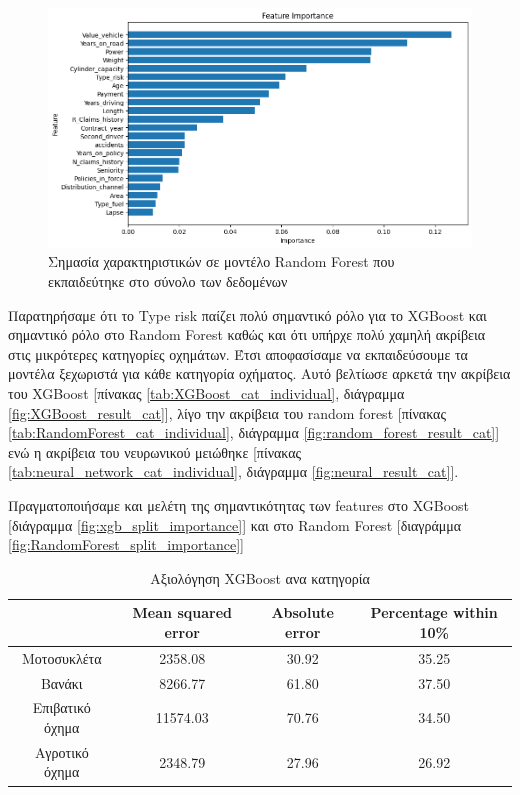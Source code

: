 \documentclass{llncs}
\begin{document}
\begin{figure}
    \begin{center}
        \includegraphics[width=1\textwidth]{images/feature_importance_combined_random_forest.png}
    \end{center}
    \caption{Σημασία χαρακτηριστικών σε μοντέλο Random Forest που εκπαιδεύτηκε στο σύνολο των δεδομένων}  
    \label{fig:random_forest_all_feature_importance}  
\end{figure}

Παρατηρήσαμε ότι το Type risk παίζει πολύ σημαντικό ρόλο για το XGBoost και σημαντικό ρόλο στο
Random Forest καθώς και ότι υπήρχε πολύ χαμηλή ακρίβεια στις μικρότερες κατηγορίες οχημάτων. Έτσι
αποφασίσαμε να εκπαιδεύσουμε τα μοντέλα ξεχωριστά για κάθε κατηγορία οχήματος. Αυτό βελτίωσε αρκετά την ακρίβεια 
του XGBoost [πίνακας \ref{tab:XGBoost_cat_individual}, διάγραμμα \ref{fig:XGBoost_result_cat}], 
λίγο την ακρίβεια του random forest [πίνακας \ref{tab:RandomForest_cat_individual}, διάγραμμα \ref{fig:random_forest_result_cat}] 
ενώ η ακρίβεια του νευρωνικού μειώθηκε [πίνακας \ref{tab:neural_network_cat_individual}, διάγραμμα \ref{fig:neural_result_cat}].

Πραγματοποιήσαμε και μελέτη της σημαντικότητας των features 
στο XGBoost [διάγραμμα \ref{fig:xgb_split_importance}] και 
στο Random Forest [διαγράμμα \ref{fig:RandomForest_split_importance}]

\begin{table}
    \centering
    \begin{tabular}{|c|c|c|c|} %
        \hline
         &Mean squared error & Absolute error & Percentage within 10\% \\ %
        \hline
        Μοτοσυκλέτα & 2358.08 & 30.92 & 35.25 \\
        Βανάκι & 8266.77 & 61.80 & 37.50 \\
        Επιβατικό όχημα & 11574.03 & 70.76 & 34.50 \\
        Αγροτικό όχημα & 2348.79 & 27.96 & 26.92 \\
        \hline
    \end{tabular}
    \caption{Αξιολόγηση XGBoost ανα κατηγορία}
    \label{tab:XGBoost_cat_together}
\end{table}
\end{document}
